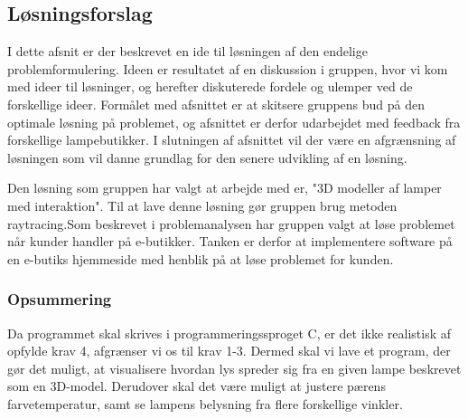 \subsection{Løsningsforslag}
I dette afsnit er der beskrevet en ide til løsningen af den endelige problemformulering. Ideen er resultatet af en diskussion i gruppen, hvor vi kom med ideer til løsninger, og herefter diskuterede fordele og ulemper ved de forskellige ideer. Formålet med afsnittet er at skitsere gruppens bud på den optimale løsning på problemet, og afsnittet er derfor udarbejdet med feedback fra forskellige lampebutikker. I slutningen af afsnittet vil der være en afgrænsning af løsningen som vil danne grundlag for den senere udvikling af en løsning.

Den løsning som gruppen har valgt at arbejde med er, "3D modeller af lamper med interaktion". Til at lave denne løsning gør gruppen brug metoden raytracing.\newline Som beskrevet i problemanalysen har gruppen valgt at løse problemet når kunder handler på e-butikker. Tanken er derfor at implementere software på en e-butiks hjemmeside med henblik på at løse problemet for kunden.





\subsubsection*{Opsummering}

Da programmet skal skrives i programmeringssproget C, er det ikke realistisk af opfylde krav 4, afgrænser vi os til krav 1-3. Dermed skal vi lave et program, der gør det muligt, at visualisere hvordan lys spreder sig fra en given lampe beskrevet som en 3D-model. Derudover skal det være muligt at justere pærens farvetemperatur, samt se lampens belysning fra flere forskellige vinkler. 